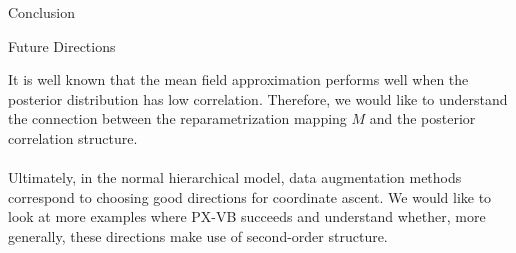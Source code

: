 \documentclass[final]{beamer}
\newlength{\onecolwid}
\begin{document}
\begin{frame}[t]
\begin{columns}[t]
\begin{column}{\onecolwid}
\begin{block}{Conclusion}
\end{block}


\begin{block}{Future Directions}




It is well known that the mean field approximation performs well when the posterior distribution has low correlation. Therefore, we would like to understand the connection between the reparametrization mapping $M$ and the posterior correlation structure. ~\\~\\

Ultimately, in the normal hierarchical model, data augmentation methods correspond to choosing good directions for coordinate ascent. We would like to look at more examples where PX-VB succeeds and understand whether, more generally, these directions make use of second-order structure.




\end{block}



\end{column}
\end{columns}
\end{frame}
\end{document}
